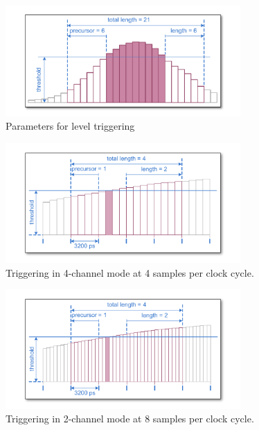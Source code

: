 \begin{figure}[hb]
    \centering
    \includegraphics[width=0.8\textwidth]{figures/level-trigger.pdf}
    \caption{Parameters for level triggering\label{fig:level-trigger}}
\end{figure}

\begin{figure}[ht]
    \centering
    \includegraphics[width=0.8\textwidth]{figures/4ChannelTriggering.pdf}
    \caption{Triggering in 4-channel mode at 4 samples per clock cycle.\label{fig:4ChannelTriggering}}
\end{figure}

\begin{figure}[hb]
    \centering
    \includegraphics[width=0.8\textwidth]{figures/2ChannelTriggering.pdf}
    \caption{Triggering in 2-channel mode at 8 samples per clock cycle.\label{fig:2ChannelTriggering}}
\end{figure}

